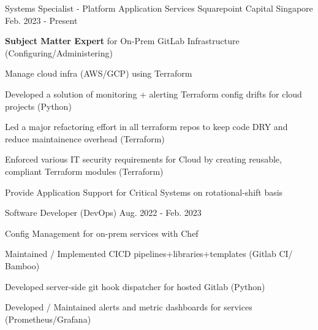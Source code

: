 

\begin{cventries}

  \cventry
    {Systems Specialist - Platform Application Services} %
    {Squarepoint Capital} %
    {Singapore} %
    {Feb. 2023 - Present} %
    {
      \begin{cvitems} %
        \item {\textbf{Subject Matter Expert} for On-Prem GitLab Infrastructure (Configuring/Administering)}
        \item {Manage cloud infra (AWS/GCP) using Terraform}
        \item {Developed a solution of monitoring + alerting Terraform config drifts for cloud projects (Python)}
        \item {Led a major refactoring effort in all terraform repos to keep code DRY and reduce maintainence overhead (Terraform)}
        \item {Enforced various IT security requirements for Cloud by creating reusable, compliant Terraform modules (Terraform)}
        \item {Provide Application Support for Critical Systems on rotational-shift basis}
      \end{cvitems}
    }

  \cventry
    {Software Developer (DevOps)} %
    {} %
    {} %
    {Aug. 2022 - Feb. 2023} %
    {
      \begin{cvitems} %
        \item {Config Management for on-prem services with Chef}
        \item {Maintained / Implemented CICD pipelines+libraries+templates (Gitlab CI/ Bamboo)}
        \item {Developed server-side git hook dispatcher for hosted Gitlab (Python)}
        \item {Developed / Maintained alerts and metric dashboards for services (Prometheus/Grafana)}
      \end{cvitems}
    }


\end{cventries}
